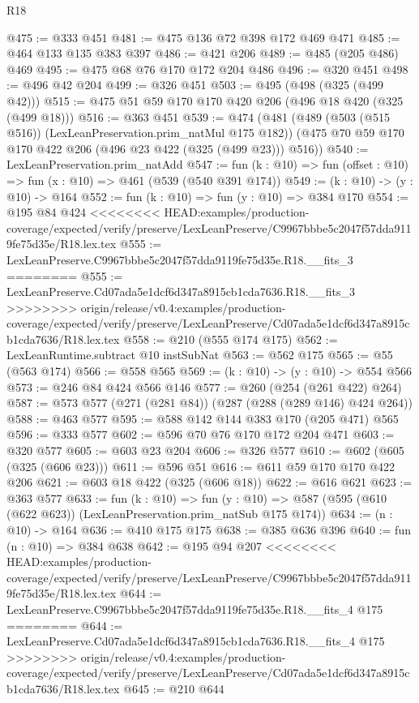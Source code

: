 \begin{lexlean}{R18}
\begin{coremodule}
{{{{{{{{{{{{{@475 := @333 @451
@481 := @475 @136 @72 @398 @172 @469 @471
@485 := @464 @133 @135 @383 @397
@486 := @421 @206
@489 := @485 (@205 @486) @469
@495 := @475 @68 @76 @170 @172 @204 @486
@496 := @320 @451
@498 := @496 @42 @204
@499 := @326 @451
@503 := @495 (@498 (@325 (@499 @42)))
@515 := @475 @51 @59 @170 @170 @420 @206 (@496 @18 @420 (@325 (@499 @18)))
@516 := @363 @451
@539 := @474
    (@481
      (@489 (@503 (@515 @516)) (LexLeanPreservation.prim_natMul @175 @182))
      (@475 @70 @59 @170 @170 @422 @206 (@496 @23 @422 (@325 (@499 @23))) @516))
@540 := LexLeanPreservation.prim_natAdd
@547 := fun (k : @10) => fun (offset : @10) => fun (x : @10) => @461 (@539 (@540 @391 @174))
@549 := (k : @10) -> (y : @10) -> @164
@552 := fun (k : @10) => fun (y : @10) => @384 @170
@554 := @195 @84 @424
<<<<<<<< HEAD:examples/production-coverage/expected/verify/preserve/LexLeanPreserve/C9967bbbe5c2047f57dda9119fe75d35e/R18.lex.tex
@555 := LexLeanPreserve.C9967bbbe5c2047f57dda9119fe75d35e.R18.__fits_3
========
@555 := LexLeanPreserve.Cd07ada5e1dcf6d347a8915cb1cda7636.R18.__fits_3
>>>>>>>> origin/release/v0.4:examples/production-coverage/expected/verify/preserve/LexLeanPreserve/Cd07ada5e1dcf6d347a8915cb1cda7636/R18.lex.tex
@558 := @210 (@555 @174 @175)
@562 := LexLeanRuntime.subtract @10 instSubNat
@563 := @562 @175
@565 := @55 (@563 @174)
@566 := @558 @565
@569 := (k : @10) -> (y : @10) -> @554 @566
@573 := @246 @84 @424 @566 @146
@577 := @260 (@254 (@261 @422) @264)
@587 := @573 @577 (@271 (@281 @84)) (@287 (@288 (@289 @146) @424 @264))
@588 := @463 @577
@595 := @588 @142 @144 @383 @170 (@205 @471) @565
@596 := @333 @577
@602 := @596 @70 @76 @170 @172 @204 @471
@603 := @320 @577
@605 := @603 @23 @204
@606 := @326 @577
@610 := @602 (@605 (@325 (@606 @23)))
@611 := @596 @51
@616 := @611 @59 @170 @170 @422 @206
@621 := @603 @18 @422 (@325 (@606 @18))
@622 := @616 @621
@623 := @363 @577
@633 := fun (k : @10) =>
  fun (y : @10) => @587 (@595 (@610 (@622 @623)) (LexLeanPreservation.prim_natSub @175 @174))
@634 := (n : @10) -> @164
@636 := @410 @175 @175
@638 := @385 @636 @396
@640 := fun (n : @10) => @384 @638
@642 := @195 @94 @207
<<<<<<<< HEAD:examples/production-coverage/expected/verify/preserve/LexLeanPreserve/C9967bbbe5c2047f57dda9119fe75d35e/R18.lex.tex
@644 := LexLeanPreserve.C9967bbbe5c2047f57dda9119fe75d35e.R18.__fits_4 @175
========
@644 := LexLeanPreserve.Cd07ada5e1dcf6d347a8915cb1cda7636.R18.__fits_4 @175
>>>>>>>> origin/release/v0.4:examples/production-coverage/expected/verify/preserve/LexLeanPreserve/Cd07ada5e1dcf6d347a8915cb1cda7636/R18.lex.tex
@645 := @210 @644
}}}}}}}}}}}}}
\end{coremodule}
\end{lexlean}
